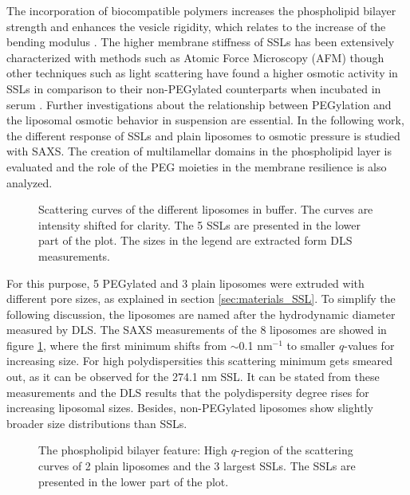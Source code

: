 The incorporation of biocompatible polymers increases the phospholipid bilayer strength and enhances the vesicle rigidity, which relates to the increase of the bending modulus \cite{liang_effect_2005, sou_polyethylene_2000}. The higher membrane stiffness of SSLs has been extensively characterized with methods such as Atomic Force Microscopy (AFM) \cite{spyratou_atomic_2009} though other techniques such as light scattering have found a higher osmotic activity in SSLs in comparison to their non-PEGylated counterparts when incubated in serum \cite{wolfram_shrinkage_2014}. Further investigations about the relationship between PEGylation and the liposomal osmotic behavior in suspension are essential. In the following work, the different response of SSLs and plain liposomes to osmotic pressure is studied with SAXS. The creation of multilamellar domains in the phospholipid layer is evaluated and the role of the PEG moieties in the membrane resilience is also analyzed.

\begin{figure}
	\centering
		
		\caption{Scattering curves of the different liposomes in buffer. The curves are intensity shifted for clarity. The 5 SSLs are presented in the lower part of the plot. The sizes in the legend are extracted form DLS measurements.}
		\label{fig:SSLSingleContrast}
\end{figure}

For this purpose, 5 PEGylated and 3 plain liposomes were extruded with different pore sizes, as explained in section \ref{sec:materials_SSL}. To simplify the following discussion, the liposomes are named after the hydrodynamic diameter measured by DLS. The SAXS measurements of the 8 liposomes are showed in figure \ref{fig:SSLSingleContrast}, where the first minimum shifts from $\sim$0.1 nm$^{-1}$ to smaller $q$-values for increasing size. For high polydispersities this scattering minimum gets smeared out, as it can be observed for the 274.1 nm SSL. It can be stated from these measurements and the DLS results that the polydispersity degree rises for increasing liposomal sizes. Besides, non-PEGylated liposomes show slightly broader size distributions than SSLs.

\begin{figure}
	\centering
		
		\caption{The phospholipid bilayer feature: High $q$-region of the scattering curves of 2 plain liposomes and the 3 largest SSLs. The SSLs are presented in the lower part of the plot.}
		\label{fig:SSLSingleContrastBilayer}
\end{figure}

